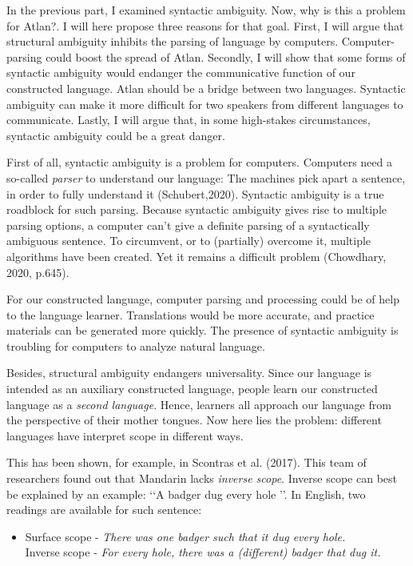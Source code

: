 \noindent In the previous part, I examined syntactic ambiguity. Now, why is this a problem for Atlan?. I will here propose three reasons for that goal. First, I will argue that structural ambiguity inhibits the parsing of language by computers. Computer-parsing could boost the spread of Atlan. Secondly, I will show that some forms of syntactic ambiguity would endanger the communicative function of our constructed language. Atlan should be a bridge between two languages. Syntactic ambiguity can make it more difficult for two speakers from different languages to communicate.  Lastly, I will argue that, in some high-stakes circumstances, syntactic ambiguity could be a great danger.

First of all, syntactic ambiguity is a problem for computers. Computers need a so-called {\it parser} to understand our language: The machines pick apart a sentence, in order to fully understand it (Schubert,2020). Syntactic ambiguity is a true roadblock for such parsing. Because syntactic ambiguity gives rise to multiple parsing options, a computer can't give a definite parsing of a syntactically ambiguous sentence. To circumvent, or to (partially) overcome it, multiple algorithms have been created. Yet it remains a difficult problem (Chowdhary, 2020, p.645).

For our constructed language, computer parsing and processing could be of help to the language learner. Translations would be more accurate, and practice materials can be generated more quickly. The presence of syntactic ambiguity is troubling for computers to analyze natural language.

Besides, structural ambiguity endangers universality. Since our language is intended as an auxiliary constructed language, people learn our constructed language as a {\it second language}. Hence, learners all approach our language from the perspective of their mother tongues. Now here lies the problem: different languages have interpret scope in different ways.

This has been shown, for example, in Scontras et al. (2017). This team of researchers found out that Mandarin lacks \textit{inverse scope}. Inverse scope can best be explained by an example: \lq\lq A badger dug every hole \rq\rq. In English, two readings are available for such sentence:

\begin{itemize}
	\item[]Surface scope - {\it There was one badger such that it dug every hole.}\\
		Inverse scope - {\it For every hole, there was a (different) badger that dug it.}
\end{itemize}
	
